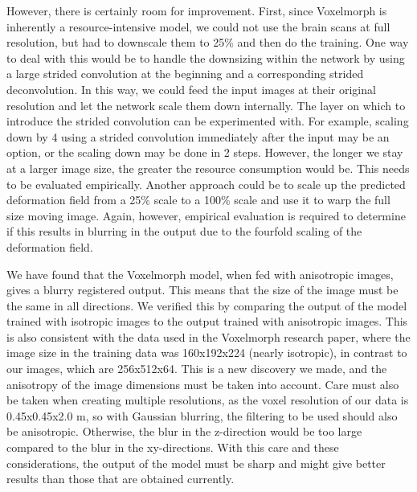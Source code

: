 \documentclass{book}
\begin{document}
	However, there is certainly room for improvement. First, since Voxelmorph is inherently a resource-intensive model, we could not use the brain scans at full resolution, but had to downscale them to 25\% and then do the training. One way to deal with this would be to handle the downsizing within the network by using a large strided convolution at the beginning and a corresponding strided deconvolution. In this way, we could feed the input images at their original resolution and let the network scale them down internally. The layer on which to introduce the strided convolution can be experimented with. For example, scaling down by 4 using a strided convolution immediately after the input may be an option, or the scaling down may be done in 2 steps. However, the longer we stay at a larger image size, the greater the resource consumption would be. This needs to be evaluated empirically. Another approach could be to scale up the predicted deformation field from a 25\% scale to a 100\% scale and use it to warp the full size moving image. Again, however, empirical evaluation is required to determine if this results in blurring in the output due to the fourfold scaling of the deformation field.
	
	We have found that the Voxelmorph model, when fed with anisotropic images, gives a blurry registered output. This means that the size of the image must be the same in all directions. We verified this by comparing the output of the model trained with isotropic images to the output trained with anisotropic images. This is also consistent with the data used in the Voxelmorph research paper, where the image size in the training data was 160x192x224 (nearly isotropic), in contrast to our images, which are 256x512x64. This is a new discovery we made, and the anisotropy of the image dimensions must be taken into account. Care must also be taken when creating multiple resolutions, as the voxel resolution of our data is 0.45x0.45x2.0 \textmu m, so with Gaussian blurring, the filtering to be used should also be anisotropic. Otherwise, the blur in the z-direction would be too large compared to the blur in the xy-directions. With this care and these considerations, the output of the model must be sharp and might give better results than those that are obtained currently.
	
	
	
	
	\newpage
	\listoffigures %
	\listoftables
	\lstlistoflistings %
	
	\begin{appendix}
		
		\cleardoublepage
	\end{appendix}
	
	
	
\end{document}
